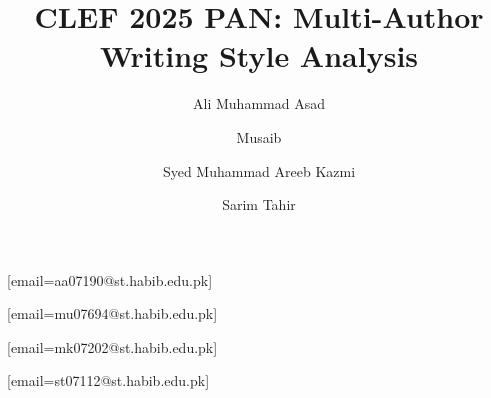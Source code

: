 \documentclass[
]{ceurart}
\begin{document}

\conference{}

\title{CLEF 2025 PAN: Multi-Author Writing Style Analysis}


\author[1]{Ali Muhammad Asad}[email=aa07190@st.habib.edu.pk]
\address[1]{Department of Computer Science, Habib University}

\author[2]{Musaib}[email=mu07694@st.habib.edu.pk]
\address[2]{Department of Computer Science, Habib University}

\author[3]{Syed Muhammad Areeb Kazmi}[email=mk07202@st.habib.edu.pk]
\address[3]{Department of Computer Science, Habib University}

\author[4]{Sarim Tahir}[email=st07112@st.habib.edu.pk]
\address[4]{Department of Computer Science, Habib University}





\maketitle




\end{document}
